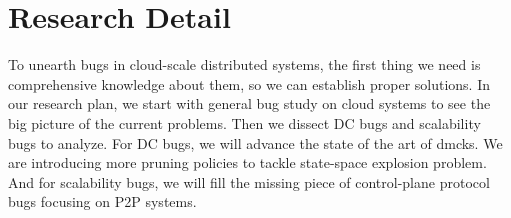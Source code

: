 \chapter{Research Detail}
\label{chp-detail}

To unearth bugs in cloud-scale distributed systems, the first thing we need is
comprehensive knowledge about them, so we can establish proper solutions. In our
research plan, we start with general bug study on cloud systems to see the big
picture of the current problems. Then we dissect DC bugs and scalability bugs to
analyze.
%
For DC bugs, we will advance the state of the art of dmcks. We are introducing 
more pruning policies to tackle state-space explosion problem. And for
scalability bugs, we will fill the missing piece of control-plane protocol bugs
focusing on P2P systems.






